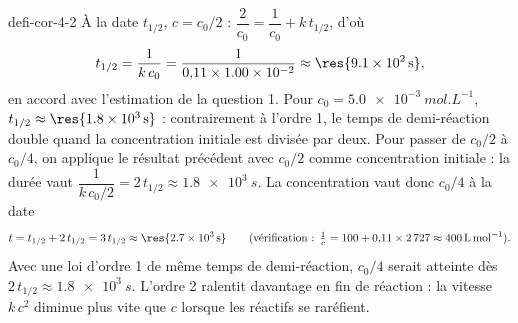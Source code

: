 \begin{blocEdition}{defi-cor-4-2}
\label{figedition-defi-cor-4-2-1}
À la date $t_{1/2}$, $c=c_0/2$ : $\dfrac{2}{c_0}=\dfrac{1}{c_0}+k\,t_{1/2}$, d'où
\[t_{1/2}=\frac{1}{k\,c_0}=\frac{1}{0{,}11\times\num{1.00e-2}}\approx\res{\qty{9,1e2}{s}},\]
en accord avec l'estimation de la question 1. Pour $c_0=\qty{5,0e-3}{mol.L^{-1}}$, $t_{1/2}\approx\res{\qty{1,8e3}{s}}$ :
contrairement à l'ordre 1, le temps de demi-réaction double quand la concentration initiale est divisée par deux.
Pour passer de $c_0/2$ à $c_0/4$, on applique le résultat précédent avec $c_0/2$ comme concentration initiale :
la durée vaut $\dfrac{1}{k\,c_0/2}=2\,t_{1/2}\approx\qty{1,8e3}{s}$. La concentration vaut donc $c_0/4$ à la date
\[t=t_{1/2}+2\,t_{1/2}=3\,t_{1/2}\approx\res{\qty{2,7e3}{s}}\qquad\text{(vérification : }\tfrac{1}{c}=100+0{,}11\times2\,727\approx\qty{400}{L.mol^{-1}}\text{)}.\]
Avec une loi d'ordre 1 de même temps de demi-réaction, $c_0/4$ serait atteinte dès $2\,t_{1/2}\approx\qty{1,8e3}{s}$.
L'ordre 2 ralentit davantage en fin de réaction : la vitesse $k\,c^2$ diminue plus vite que $c$ lorsque les réactifs
se raréfient.
\end{blocEdition}

